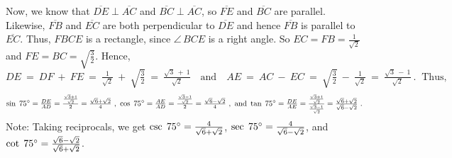 \begin{exmp}
Now, we know that $\overline{DE} \perp \overline{AC}$ and $\overline{BC} \perp \overline{AC}$, so
$\overline{FE}$ and $\overline{BC}$ are parallel. Likewise, $\overline{FB}$ and $\overline{EC}$ are
both perpendicular to $\overline{DE}$ and hence $\overline{FB}$ is parallel to $\overline{EC}$.
Thus, $FBCE$ is a rectangle, since $\angle\,BCE$ is a right angle. So $EC = FB = \frac{1}{\sqrt{2}}$
and $FE = BC = \sqrt{\frac{3}{2}}$. Hence,
\begin{displaymath}
 DE ~=~ DF ~+~ FE ~=~ \tfrac{1}{\sqrt{2}} ~+~ \sqrt{\tfrac{3}{2}} ~=~ \tfrac{\sqrt{3} ~+~ 1}{\sqrt{2}}
 \quad\text{and}\quad
 AE ~=~ AC ~-~ EC ~=~ \sqrt{\tfrac{3}{2}} ~-~ \tfrac{1}{\sqrt{2}} ~=~ \tfrac{\sqrt{3} ~-~ 1}{\sqrt{2}}
 ~. ~\text{ Thus,}
\end{displaymath}
\begin{displaymath}
 \sin\;75^\circ = \tfrac{DE}{AD} = \tfrac{\frac{\sqrt{3} + 1}{\sqrt{2}}}{2} =
 \tfrac{\sqrt{6} + \sqrt{2}}{4} ~,~ \cos\;75^\circ = \tfrac{AE}{AD} =
 \tfrac{\frac{\sqrt{3} - 1}{\sqrt{2}}}{2} = \tfrac{\sqrt{6} - \sqrt{2}}{4}
 ~,~\text{and} ~ \tan\;75^\circ =
 \tfrac{DE}{AE} = \tfrac{\frac{\sqrt{3} + 1}{\sqrt{2}}}{\frac{\sqrt{3} - 1}{\sqrt{2}}} =
 \tfrac{\sqrt{6} + \sqrt{2}}{\sqrt{6} - \sqrt{2}} ~.
\end{displaymath}
Note: Taking reciprocals, we get $\csc\;75^\circ = \frac{4}{\sqrt{6} + \sqrt{2}}$,
$\sec\;75^\circ = \frac{4}{\sqrt{6} - \sqrt{2}}$, and 
$\cot\;75^\circ = \frac{\sqrt{6} - \sqrt{2}}{\sqrt{6} + \sqrt{2}}$.
\end{exmp}\vspace{-2mm}
\divider
\vspace{3mm}

